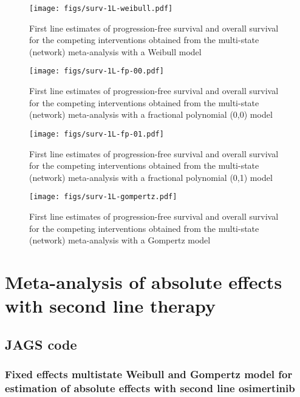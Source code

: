 \documentclass[11pt,final,fleqn]{article}\usepackage[]{graphicx}\usepackage[]{color}
\theoremstyle{plain}
\begin{document}
\begin{appendices}
\begin{figure}[h]
\centering
\texttt{[image: figs/surv-1L-weibull.pdf]} 
\caption{First line estimates of progression-free survival and overall survival for the competing interventions obtained from the multi-state (network) meta-analysis with a Weibull model}\label{fig:surv-1L-weibull}
\end{figure}

\begin{figure}[h]
\centering
\texttt{[image: figs/surv-1L-fp-00.pdf]} 
\caption{First line estimates of progression-free survival and overall survival for the competing interventions obtained from the multi-state (network) meta-analysis with a fractional polynomial (0,0) model}\label{fig:surv-1L-fp-00}
\end{figure}

\begin{figure}[h]
\centering
\texttt{[image: figs/surv-1L-fp-01.pdf]} 
\caption{First line estimates of progression-free survival and overall survival for the competing interventions obtained from the multi-state (network) meta-analysis with a fractional polynomial (0,1) model}\label{fig:surv-1L-fp-01}
\end{figure}

\begin{figure}[h]
\centering
\texttt{[image: figs/surv-1L-gompertz.pdf]} 
\caption{First line estimates of progression-free survival and overall survival for the competing interventions obtained from the multi-state (network) meta-analysis with a Gompertz model}\label{fig:surv-1L-gompertz}
\end{figure}



\section{Meta-analysis of absolute effects with second line therapy}
\subsection{JAGS code}\label{sec:2l-jags}

\subsubsection{Fixed effects multistate Weibull and Gompertz model for estimation of absolute effects with second line osimertinib}  
\begin{verbatim} 


\end{verbatim}
\end{appendices}
\end{document}
